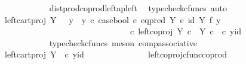 \begin{isabellebody}
\ \ \ \ \ \ \ \ \ \ \ \ \isamarkupfalse%
\ dist{\isacharunderscore}{\kern0pt}prod{\isacharunderscore}{\kern0pt}coprod{\isacharunderscore}{\kern0pt}left{\isacharunderscore}{\kern0pt}ap{\isacharunderscore}{\kern0pt}left\ \isamarkupfalse%
\ {\isacharparenleft}{\kern0pt}typecheck{\isacharunderscore}{\kern0pt}cfuncs{\isacharcomma}{\kern0pt}\ auto{\isacharparenright}{\kern0pt}\isanewline
\ \ \ \ \ \ \ \ \ \ \isamarkupfalse%
\ \isamarkupfalse%
\ {\isachardoublequoteopen}{\isachardot}{\kern0pt}{\isachardot}{\kern0pt}{\isachardot}{\kern0pt}\ {\isacharequal}{\kern0pt}\ {\isacharparenleft}{\kern0pt}{\isacharparenleft}{\kern0pt}left{\isacharunderscore}{\kern0pt}cart{\isacharunderscore}{\kern0pt}proj\ Y\ {\isasymone}\ {\isasymamalg}\ {\isacharparenleft}{\kern0pt}{\isacharparenleft}{\kern0pt}y{}\ {\isasymamalg}\ y{}{\isacharparenright}{\kern0pt}\ {\isasymcirc}\isactrlsub c\ case{\isacharunderscore}{\kern0pt}bool\ {\isasymcirc}\isactrlsub c\ eq{\isacharunderscore}{\kern0pt}pred\ Y\ {\isasymcirc}\isactrlsub c\ {\isacharparenleft}{\kern0pt}id\ Y\ {\isasymtimes}\isactrlsub f\ y{}{\isacharparenright}{\kern0pt}{\isacharparenright}{\kern0pt}{\isacharparenright}{\kern0pt}\ \isanewline
\ \ \ \ \ \ \ \ \ \ \ \ \ \ \ \ \ \ \ \ \ \ \ \ \ \ \ \ \ \ \ \ \ {\isasymcirc}\isactrlsub c\ left{\isacharunderscore}{\kern0pt}coproj\ {\isacharparenleft}{\kern0pt}Y\ {\isasymtimes}\isactrlsub c\ {\isasymone}{\isacharparenright}{\kern0pt}\ {\isacharparenleft}{\kern0pt}Y\ {\isasymtimes}\isactrlsub c\ {\isasymone}{\isacharparenright}{\kern0pt}{\isacharparenright}{\kern0pt}\ {\isasymcirc}\isactrlsub c\ {\isasymlangle}y{\isacharcomma}{\kern0pt}id\ {\isasymone}{\isasymrangle}{\isachardoublequoteclose}\isanewline
\ \ \ \ \ \ \ \ \ \ \ \ \isamarkupfalse%
\ {\isacharparenleft}{\kern0pt}typecheck{\isacharunderscore}{\kern0pt}cfuncs{\isacharcomma}{\kern0pt}\ meson\ comp{\isacharunderscore}{\kern0pt}associative{}{\isacharparenright}{\kern0pt}\isanewline
\ \ \ \ \ \ \ \ \ \ \isamarkupfalse%
\ \isamarkupfalse%
\ {\isachardoublequoteopen}{\isachardot}{\kern0pt}{\isachardot}{\kern0pt}{\isachardot}{\kern0pt}\ {\isacharequal}{\kern0pt}\ left{\isacharunderscore}{\kern0pt}cart{\isacharunderscore}{\kern0pt}proj\ Y\ {\isasymone}\ {\isasymcirc}\isactrlsub c\ {\isasymlangle}y{\isacharcomma}{\kern0pt}id\ {\isasymone}{\isasymrangle}{\isachardoublequoteclose}\isanewline
\ \ \ \ \ \ \ \ \ \ \ \ \isamarkupfalse%
\ left{\isacharunderscore}{\kern0pt}coproj{\isacharunderscore}{\kern0pt}cfunc{\isacharunderscore}{\kern0pt}coprod\ \isamarkupfalse%

\end{isabellebody}
